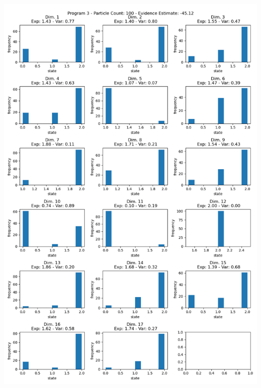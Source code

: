 \documentclass[10pt]{homeworg}
\begin{document}
\begin{center}
\includegraphics[scale=0.5]{figures/program3/100_particles.png}
\end{center}

\newpage
\end{document}
